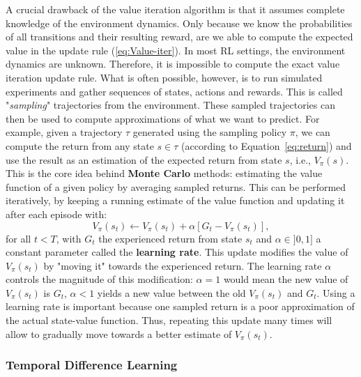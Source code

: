 A crucial drawback of the value iteration algorithm is that it assumes complete knowledge of the environment dynamics. Only because we know the probabilities of all transitions and their resulting reward, are we able to compute the expected value in the update rule (\ref{eq:Value-iter}). In most RL settings, the environment dynamics are unknown. Therefore, it is impossible to compute the exact value iteration update rule. What is often possible, however, is to run simulated experiments and gather sequences of states, actions and rewards. This is called "\textit{sampling}" trajectories from the environment. These sampled trajectories can then be used to compute approximations of what we want to predict. For example, given a trajectory $\tau$ generated using the sampling policy $\pi$, we can compute the return from any state $s\in\tau$ (according to Equation~\ref{eq:return}) and use the result as an estimation of the expected return from state $s$, i.e., $V_\pi(s)$. This is the core idea behind \textbf{Monte Carlo} methods: estimating the value function of a given policy by averaging sampled returns. This can be performed iteratively, by keeping a running estimate of the value function and updating it after each episode with:
\begin{equation}
    V_\pi(s_t)\leftarrow V_\pi(s_t)+\alpha\left[G_t-V_\pi(s_t)\right],
    \label{eq:Monte-Carlo}
\end{equation}
for all $t<T$, with $G_t$ the experienced return from state $s_t$ and $\alpha\in]0,1]$ a constant parameter called the \textbf{learning rate}. This update modifies the value of $V_\pi(s_t)$ by "moving it" towards the experienced return. The learning rate $\alpha$ controls the magnitude of this modification: $\alpha=1$ would mean the new value of $V_\pi(s_t)$ is $G_t$, $\alpha<1$ yields a new value between the old $V_\pi(s_t)$ and $G_t$. Using a learning rate is important because one sampled return is a poor approximation of the actual state-value function. Thus, repeating this update many times will allow to gradually move towards a better estimate of $V_\pi(s_t)$.

\subsubsection{Temporal Difference Learning}\label{sec:RL:TD}

